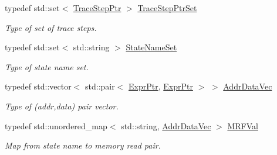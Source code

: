 \begin{DoxyCompactItemize}
\mbox{\label{classilang_1_1_trace_step_a83bd16e93305d10001282dbc5adb1583}} 
typedef std\+::set$<$ \mbox{\hyperlink{classilang_1_1_trace_step_a33d28af7bafbd3eadec8a957c63738ca}{Trace\+Step\+Ptr}} $>$ \mbox{\hyperlink{classilang_1_1_trace_step_a83bd16e93305d10001282dbc5adb1583}{Trace\+Step\+Ptr\+Set}}
\begin{DoxyCompactList}\small\item\em Type of set of trace steps. \end{DoxyCompactList}\item 
\mbox{\label{classilang_1_1_trace_step_a784c4a30b16707ec6a2ed6e96e268c86}} 
typedef std\+::set$<$ std\+::string $>$ \mbox{\hyperlink{classilang_1_1_trace_step_a784c4a30b16707ec6a2ed6e96e268c86}{State\+Name\+Set}}
\begin{DoxyCompactList}\small\item\em Type of state name set. \end{DoxyCompactList}\item 
\mbox{\label{classilang_1_1_trace_step_aad863955fb33a4d2604383d407eaade2}} 
typedef std\+::vector$<$ std\+::pair$<$ \mbox{\hyperlink{namespaceilang_a7c4196c72e53ea4df4b7861af7bc3bce}{Expr\+Ptr}}, \mbox{\hyperlink{namespaceilang_a7c4196c72e53ea4df4b7861af7bc3bce}{Expr\+Ptr}} $>$ $>$ \mbox{\hyperlink{classilang_1_1_trace_step_aad863955fb33a4d2604383d407eaade2}{Addr\+Data\+Vec}}
\begin{DoxyCompactList}\small\item\em Type of (addr,data) pair vector. \end{DoxyCompactList}\item 
\mbox{\label{classilang_1_1_trace_step_ad57144131ae15f38344eb4626446e30e}} 
typedef std\+::unordered\+\_\+map$<$ std\+::string, \mbox{\hyperlink{classilang_1_1_trace_step_aad863955fb33a4d2604383d407eaade2}{Addr\+Data\+Vec}} $>$ \mbox{\hyperlink{classilang_1_1_trace_step_ad57144131ae15f38344eb4626446e30e}{M\+R\+F\+Val}}
\begin{DoxyCompactList}\small\item\em Map from state name to memory read pair. \end{DoxyCompactList}\end{DoxyCompactItemize}

